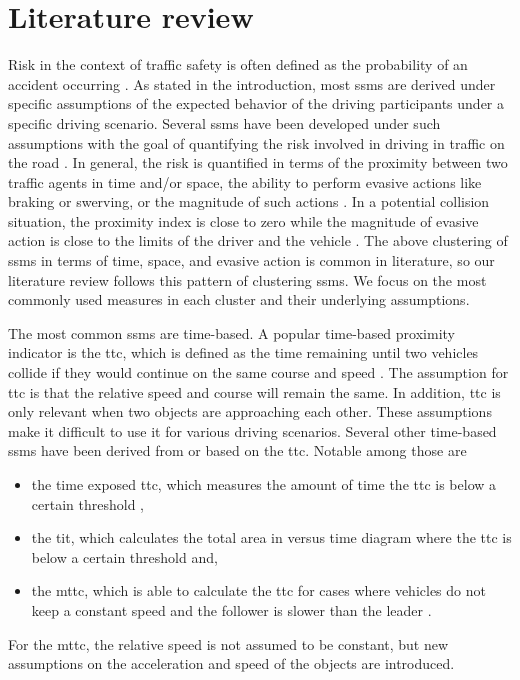 \section{Literature review}
\label{sec:literature review}

Risk in the context of traffic safety is \cstartc often \cendc defined as the probability of an accident occurring \autocite{hakkert2002uses}.
\cstartb As stated in the introduction, most \acp{ssm} are derived under specific assumptions of the expected behavior of the  driving participants under a specific  driving scenario. \cendb
Several \acp{ssm} have been developed \cstartb under such assumptions \cendb with the goal of quantifying the risk involved in driving in traffic on the road \autocite{minderhoud2001extended, ozbay2008derivation, cunto2009simulated, laureshyn2010evaluation}.
In general, the risk is quantified in terms of the proximity between two traffic agents in time and/or space, the ability to perform evasive actions like braking or swerving, or the magnitude of such actions \autocite{shi2018key,zheng2020modeling}. 
In a potential collision situation, the proximity index is close to zero while the magnitude of evasive action is close to the limits of the driver and the vehicle \autocite{zheng2020modeling}. 
\cstartb The above clustering of \acp{ssm} in terms of time, space, and evasive action is common in literature, so our literature review follows this pattern of clustering \acp{ssm}.
We focus on the most commonly used measures in each cluster and their underlying assumptions. \cendb

The most common \acp{ssm} are time-based. 
A popular time-based proximity indicator is the \ac{ttc}, which is defined as the time remaining until two vehicles collide if they would continue on the same course and speed \autocite{hayward1972near}.
\cstartb The assumption for \ac{ttc} is that the relative speed and course will remain the same. 
In addition, \ac{ttc} is only relevant when two objects are approaching each other. 
These assumptions make it difficult to use it  for various driving scenarios. \cendb
Several other time-based \acp{ssm} have been derived from or based on the \ac{ttc}. 
Notable among those are 
\begin{itemize}
    \item the time exposed \ac{ttc}, which measures the amount of time the \ac{ttc} is below a certain threshold \autocite{minderhoud2001extended}, 
    \item the \ac{tit}, which calculates the total area in  versus time diagram where the \ac{ttc} is below a certain threshold  \autocite{minderhoud2001extended} and,
    \item the \ac{mttc}, which is able to calculate the \ac{ttc} for cases where vehicles do not keep a constant speed and the follower is slower than the leader \autocite{ozbay2008derivation}.
\end{itemize}
\cstartb For the \ac{mttc}, the relative speed is not assumed to be constant, but new assumptions on the  acceleration and speed of the objects are introduced. \cendb 

